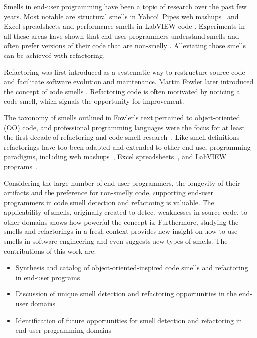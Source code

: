 \documentclass{sig-alternate}
\begin{document}
Smells in end-user programming have been a topic of research over the past few years. Most notable are structural smells in Yahoo!\ Pipes web mashups~\cite{Stolee2011} and  Excel spreadsheets \cite{Hermans2012inter} and performance smells in LabVIEW code \cite{chambers2013smell}.
Experiments in all these areas have shown that end-user programmers understand smells and often prefer versions of their code that are non-smelly \cite{Hermans2012intra, StoleeTSE2013, chambers2013smell}.
Alleviating those smells can be achieved with refactoring.

Refactoring was first introduced as a systematic way to restructure source code and facilitate software evolution and maintenance. Martin Fowler later introduced the concept of code smells \cite{Fowl1999}. 
Refactoring code is often motivated by noticing a code smell, which signals the opportunity for improvement.

The taxonomy of smells outlined in Fowler's text pertained  to object-oriented (OO) code, and professional programming languages were the focus for at least the first decade of refactoring and code smell research~\cite{Mens:2004:SSR:972215.972286}.
Like smell definitions refactorings have too been adapted and extended to other 
end-user programming paradigms, including web mashups~\cite{Stolee2011, StoleeTSE2013}, Excel spreadsheets~\cite{Hermans2011, Hermans2012inter, hermans2014bumblebee}, and LabVIEW programs~\cite{chambers2013smell}.

Considering the large number of end-user programmers, the longevity of their artifacts and the preference for non-smelly code, supporting end-user programmers in code smell detection and refactoring is valuable.
The applicability of smells, originally created to detect weaknesses in source code, to other domains shows how powerful the concept is.
Furthermore, studying the smells and refactorings in a fresh context provides new insight on how to use smells in software engineering and  even suggests new types of smells.
The contributions of this work are:

\begin{itemize}
	\item Synthesis and catalog of object-oriented-inspired code smells  and refactoring in end-user programs
	\item Discussion of unique smell detection and refactoring opportunities in the end-user domains %
	\item Identification of future opportunities for smell detection and refactoring in end-user programming domains
\end{itemize}
\end{document}
